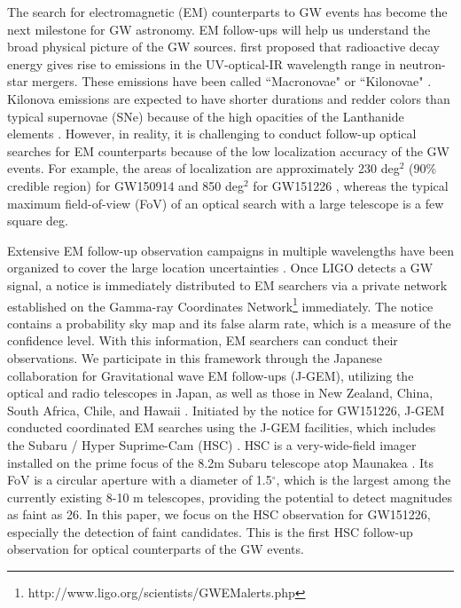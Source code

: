 \documentclass[]{pasj01}
\begin{document}
The search for electromagnetic (EM) counterparts to GW events has become the next milestone for GW astronomy.
EM follow-ups will help us understand the broad physical picture of the GW sources.
\citet{1998ApJ...507L..59L} first proposed that radioactive decay energy gives rise to emissions in the UV-optical-IR wavelength range in neutron-star mergers.
These emissions have been called ``Macronovae" \citep{2005astro.ph.10256K} or ``Kilonovae" \citep{2010MNRAS.406.2650M}.
Kilonova emissions are expected to have shorter durations and redder colors than typical supernovae (SNe)
because of the high opacities of the Lanthanide elements \citep{2013ApJ...775...18B,2013ApJ...774...25K,2013ApJ...775..113T}.
However, in reality, it is challenging to conduct follow-up optical searches for EM counterparts because of the low localization accuracy of the GW events.
For example, the areas of localization are approximately 230 deg$^2$ (90\% credible region) for GW150914
and  850 deg$^2$ for GW151226 \citep{2016PhRvX...6d1015A},
whereas the typical maximum field-of-view (FoV) of an optical search with a large telescope  is a few square deg.

Extensive EM follow-up observation campaigns in multiple wavelengths have been organized 
to cover the large location uncertainties \citep{2016ApJ...826L..13A,2016ApJS..225....8A}.
Once  LIGO detects a GW signal, a notice is immediately distributed to EM searchers 
via  a private network established on the Gamma-ray Coordinates Network\footnote{http://www.ligo.org/scientists/GWEMalerts.php} immediately.
The notice contains a probability sky map  and its false alarm rate, which is a measure of the confidence level.
With this information, EM searchers can conduct their observations.
We participate in this framework through the Japanese collaboration for Gravitational wave EM follow-ups (J-GEM),
utilizing the optical and radio telescopes in Japan, as well as those in New Zealand, China, South Africa, Chile, and Hawaii \citep{2016PASJ...68L...9M}.
Initiated by the notice for GW151226, J-GEM conducted coordinated EM searches
using the J-GEM facilities, which includes the Subaru / Hyper Suprime-Cam (HSC) \citep{2017PASJ...69....9Y}.
HSC is a very-wide-field imager installed on the prime focus of the 8.2m Subaru telescope atop Maunakea
\citep{2012SPIE.8446E..0ZM}.
Its FoV is a circular aperture with a diameter of 1.5$^{\circ}$, which is the largest among the currently existing 8-10 m telescopes,
providing the potential to detect magnitudes as faint as 26.
In this paper, we focus on the HSC observation for GW151226, especially the detection of faint candidates.
This is the first HSC follow-up observation for optical counterparts of the GW events.
\end{document}
